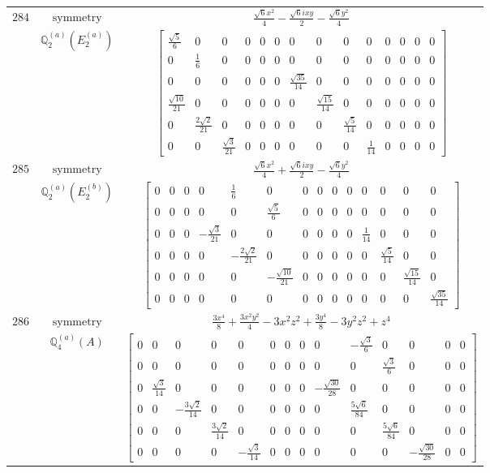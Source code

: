 \documentclass[fleqn,8pt,landscape]{jsarticle}
\begin{document}
\begin{longtable}{ccc}
$ 284 $ & $ \text{symmetry} $ & $ \frac{\sqrt{6} x^{2}}{4} - \frac{\sqrt{6} i x y}{2} - \frac{\sqrt{6} y^{2}}{4} $ \\
$  $ & $ \mathbb{Q}_{2}^{(a)}(E_{2}^{(a)}) $ & $ \begin{bmatrix} \frac{\sqrt{5}}{6} & 0 & 0 & 0 & 0 & 0 & 0 & 0 & 0 & 0 & 0 & 0 & 0 & 0 \\ 0 & \frac{1}{6} & 0 & 0 & 0 & 0 & 0 & 0 & 0 & 0 & 0 & 0 & 0 & 0 \\ 0 & 0 & 0 & 0 & 0 & 0 & \frac{\sqrt{35}}{14} & 0 & 0 & 0 & 0 & 0 & 0 & 0 \\ \frac{\sqrt{10}}{21} & 0 & 0 & 0 & 0 & 0 & 0 & \frac{\sqrt{15}}{14} & 0 & 0 & 0 & 0 & 0 & 0 \\ 0 & \frac{2 \sqrt{2}}{21} & 0 & 0 & 0 & 0 & 0 & 0 & \frac{\sqrt{5}}{14} & 0 & 0 & 0 & 0 & 0 \\ 0 & 0 & \frac{\sqrt{3}}{21} & 0 & 0 & 0 & 0 & 0 & 0 & \frac{1}{14} & 0 & 0 & 0 & 0 \end{bmatrix} $ \\ \hline
$ 285 $ & $ \text{symmetry} $ & $ \frac{\sqrt{6} x^{2}}{4} + \frac{\sqrt{6} i x y}{2} - \frac{\sqrt{6} y^{2}}{4} $ \\
$  $ & $ \mathbb{Q}_{2}^{(a)}(E_{2}^{(b)}) $ & $ \begin{bmatrix} 0 & 0 & 0 & 0 & \frac{1}{6} & 0 & 0 & 0 & 0 & 0 & 0 & 0 & 0 & 0 \\ 0 & 0 & 0 & 0 & 0 & \frac{\sqrt{5}}{6} & 0 & 0 & 0 & 0 & 0 & 0 & 0 & 0 \\ 0 & 0 & 0 & - \frac{\sqrt{3}}{21} & 0 & 0 & 0 & 0 & 0 & 0 & \frac{1}{14} & 0 & 0 & 0 \\ 0 & 0 & 0 & 0 & - \frac{2 \sqrt{2}}{21} & 0 & 0 & 0 & 0 & 0 & 0 & \frac{\sqrt{5}}{14} & 0 & 0 \\ 0 & 0 & 0 & 0 & 0 & - \frac{\sqrt{10}}{21} & 0 & 0 & 0 & 0 & 0 & 0 & \frac{\sqrt{15}}{14} & 0 \\ 0 & 0 & 0 & 0 & 0 & 0 & 0 & 0 & 0 & 0 & 0 & 0 & 0 & \frac{\sqrt{35}}{14} \end{bmatrix} $ \\ \hline
$ 286 $ & $ \text{symmetry} $ & $ \frac{3 x^{4}}{8} + \frac{3 x^{2} y^{2}}{4} - 3 x^{2} z^{2} + \frac{3 y^{4}}{8} - 3 y^{2} z^{2} + z^{4} $ \\
$  $ & $ \mathbb{Q}_{4}^{(a)}(A) $ & $ \begin{bmatrix} 0 & 0 & 0 & 0 & 0 & 0 & 0 & 0 & 0 & - \frac{\sqrt{3}}{6} & 0 & 0 & 0 & 0 \\ 0 & 0 & 0 & 0 & 0 & 0 & 0 & 0 & 0 & 0 & \frac{\sqrt{3}}{6} & 0 & 0 & 0 \\ 0 & \frac{\sqrt{3}}{14} & 0 & 0 & 0 & 0 & 0 & 0 & - \frac{\sqrt{30}}{28} & 0 & 0 & 0 & 0 & 0 \\ 0 & 0 & - \frac{3 \sqrt{2}}{14} & 0 & 0 & 0 & 0 & 0 & 0 & \frac{5 \sqrt{6}}{84} & 0 & 0 & 0 & 0 \\ 0 & 0 & 0 & \frac{3 \sqrt{2}}{14} & 0 & 0 & 0 & 0 & 0 & 0 & \frac{5 \sqrt{6}}{84} & 0 & 0 & 0 \\ 0 & 0 & 0 & 0 & - \frac{\sqrt{3}}{14} & 0 & 0 & 0 & 0 & 0 & 0 & - \frac{\sqrt{30}}{28} & 0 & 0 \end{bmatrix} $ \\ \hline

\end{longtable}
\end{document}
